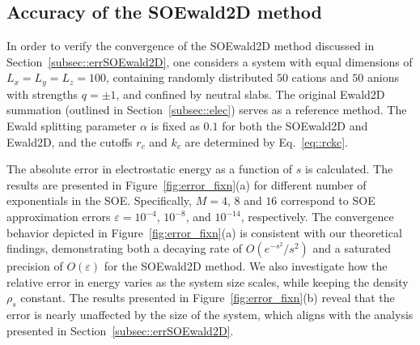 \subsection{Accuracy of the SOEwald2D method}\label{subsec::errSOE}

In order to verify the convergence of the SOEwald2D method discussed in Section~\ref{subsec::errSOEwald2D}, one considers a system with equal dimensions of $L_x=L_y=L_z=100$, containing randomly distributed $50$ cations and $50$ anions with strengths $q=\pm 1$,  and confined by neutral slabs. 
The original Ewald2D summation (outlined in Section~\ref{subsec::elec}) serves as a reference method.
The Ewald splitting parameter $\alpha$ is fixed as $0.1$ for both the SOEwald2D and Ewald2D, and the cutoffs $r_c$ and $k_c$ are determined by Eq.~\eqref{eq::rckc}. 

The absolute error in electrostatic energy as a function of $s$ is calculated. 
The results are presented in Figure~\ref{fig:error_fixn}(a) for different number of exponentials in the SOE. 
Specifically, $M=4$, $8$ and $16$ correspond to SOE approximation errors $\varepsilon =10^{-4}$, $10^{-8}$, and $10^{-14}$, respectively. 
The convergence behavior depicted in Figure~\ref{fig:error_fixn}(a) is consistent with our theoretical findings, demonstrating both a decaying rate of $O(e^{-s^2}/s^2)$ and a saturated precision of $O(\varepsilon)$ for the SOEwald2D method. 
We also investigate how the relative error in energy varies as the system size scales, while keeping the density $\rho_{s}$ constant. 
The results presented in Figure~\ref{fig:error_fixn}(b) reveal that the error is nearly unaffected by the size of the system, which aligns with the analysis presented in Section~\ref{subsec::errSOEwald2D}.

